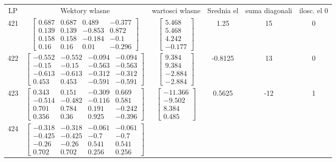 \documentclass[a4paper,12pt]{article}
\begin{document}
\bgroup {} \vspace{0.2in} \begin{tabular}{c c c c c c}
LP &Wektory wlasne & wartosci wlasne & Srednia el & suma diagonali & ilosc. el 0\\
421
&
$\begin{bmatrix} 0.687 & 0.687 & 0.489 & -0.377 \\ 0.139 & 0.139 & -0.853 & 0.872 \\ 0.158 & 0.158 & -0.184 & -0.1 \\ 0.16 & 0.16 & 0.01 & -0.296 \end{bmatrix}$
&
$\begin{bmatrix} 5.468 \\ 5.468 \\ 4.242 \\ -0.177 \end{bmatrix}$
&
1.25
&
15
&
0
\\
422
&
$\begin{bmatrix} -0.552 & -0.552 & -0.094 & -0.094 \\ -0.15 & -0.15 & -0.563 & -0.563 \\ -0.613 & -0.613 & -0.312 & -0.312 \\ 0.453 & 0.453 & -0.591 & -0.591 \end{bmatrix}$
&
$\begin{bmatrix} 9.384 \\ 9.384 \\ -2.884 \\ -2.884 \end{bmatrix}$
&
-0.8125
&
13
&
0
\\
423
&
$\begin{bmatrix} 0.343 & 0.151 & -0.309 & 0.669 \\ -0.514 & -0.482 & -0.116 & 0.581 \\ 0.701 & 0.784 & 0.191 & -0.242 \\ 0.356 & 0.36 & 0.925 & -0.396 \end{bmatrix}$
&
$\begin{bmatrix} -11.366 \\ -9.502 \\ 8.384 \\ 0.485 \end{bmatrix}$
&
0.5625
&
-12
&
1
\\
424
&
$\begin{bmatrix} -0.318 & -0.318 & -0.061 & -0.061 \\ -0.425 & -0.425 & -0.7 & -0.7 \\ -0.26 & -0.26 & 0.541 & 0.541 \\ 0.702 & 0.702 & 0.256 & 0.256 \end{bmatrix}$

\end{tabular}
\end{document}
